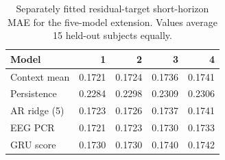 \begin{table}[!ht]
\centering
\small
\setlength{\tabcolsep}{5pt}
\renewcommand{\arraystretch}{1.1}
\caption{Separately fitted residual-target short-horizon MAE for the five-model extension. Values average 15 held-out subjects equally.}
\label{tab:supp_short_mae_residual}
\begin{tabular}{lrrrr}
\toprule
Model & 1 & 2 & 3 & 4 \\
\midrule
Context mean & 0.1721 & 0.1724 & 0.1736 & 0.1741 \\
Persistence & 0.2284 & 0.2298 & 0.2309 & 0.2306 \\
AR ridge (5) & 0.1723 & 0.1726 & 0.1737 & 0.1741 \\
EEG PCR & 0.1721 & 0.1723 & 0.1730 & 0.1733 \\
GRU score & 0.1730 & 0.1730 & 0.1740 & 0.1742 \\
\bottomrule
\end{tabular}
\end{table}
